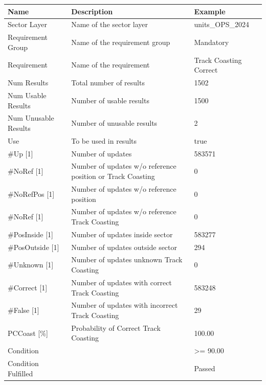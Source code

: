 \begin{center}
 \begin{table}[H]
  \begin{tabularx}{\textwidth}{ | l | X |  l | }
    \hline
    \textbf{Name} & \textbf{Description} & \textbf{Example} \\ \hline
    Sector Layer & Name of the sector layer & units\_OPS\_2024 \\ \hline
    Requirement Group & Name of the requirement group & Mandatory \\ \hline
    Requirement & Name of the requirement & Track Coasting Correct \\ \hline
    Num Results & Total number of results & 1502 \\ \hline
    Num Usable Results & Number of usable results & 1500 \\ \hline
    Num Unusable Results & Number of unusable results & 2 \\ \hline
    Use & To be used in results & true \\ \hline
    \#Up [1] & Number of updates & 583571 \\ \hline
    \#NoRef [1] & Number of updates w/o reference position or Track Coasting & 0 \\ \hline
    \#NoRefPos [1] & Number of updates w/o reference position & 0 \\ \hline
    \#NoRef [1] & Number of updates w/o reference Track Coasting & 0 \\ \hline
    \#PosInside [1] & Number of updates inside sector & 583277 \\ \hline
    \#PosOutside [1] & Number of updates outside sector & 294 \\ \hline
    \#Unknown [1] & Number of updates unknown Track Coasting & 0 \\ \hline
    \#Correct [1] & Number of updates with correct Track Coasting & 583248 \\ \hline
    \#False [1] & Number of updates with incorrect Track Coasting & 29 \\ \hline
    PCCoast [\%] & Probability of Correct Track Coasting & 100.00 \\ \hline
    Condition &  & >= 90.00 \\ \hline
    Condition Fulfilled &  & Passed \\ \hline
    \end{tabularx}
\end{table}
\end{center}

